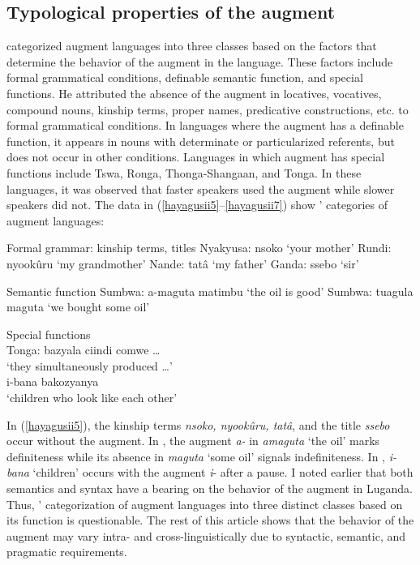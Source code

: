 \documentclass[output=paper]{langscibook}
\begin{document}
\subsection{Typological properties of the augment}
 categorized augment languages into three classes based on the factors that determine the behavior of the augment in the language. These factors include formal grammatical conditions, definable semantic function, and special functions. He attributed the absence of the augment in locatives, vocatives, compound nouns, kinship terms, proper names, predicative constructions, etc. to formal grammatical conditions. In languages where the augment has a definable function, it appears in nouns with determinate or particularized referents, but does not occur in other conditions. Languages in which augment has special functions include Tswa, Ronga, Thonga-Shangaan, and Tonga. In these languages, it was observed that faster speakers used the augment while slower speakers did not. The data in (\ref{hayagusii5}--\ref{hayagusii7}) show \citeauthor{blois1970augment}’ categories of augment languages:

\ea Formal grammar: kinship terms, titles
\label{hayagusii5}
  \ea\label{hayagusii5a} 	Nyakyusa: 	nsoko\hphantom{tiru} 		‘your mother’
  \ex\label{hayagusii5b} 	Rundi:\hphantom{iusa}		nyookûru 	‘my grandmother’
	\ex\label{hayagusii5c}  Nande:\hphantom{usa} 		tatâ\hphantom{okuru}		‘my father’
  \ex\label{hayagusii5d} 	Ganda:\hphantom{usa}		ssebo\hphantom{turu}		‘sir’
  \z
\z

\ea Semantic function
\label{hayagusii6}
  \ea\label{hayagusii6a} 	Sumbwa: 	a-maguta matimbu 	‘the oil is good’
  \ex\label{hayagusii6b} 	Sumbwa: 	tuagula maguta\hphantom{nbu} 	‘we bought some oil’
  \z
\z

\ea Special functions\\
\label{hayagusii7}
  \gllll Tonga:   {bazyala ciindi comwe \ldots}  \\
     {} {‘they simultaneously produced \ldots'} \\
     {} {i-bana bakozyanya} \\
     {} {`children who look like each other’}\\
\z

In (\ref{hayagusii5}), the kinship terms \textit{nsoko, nyookûru, tatâ}, and the title \textit{ssebo} occur without the augment. In , the augment \textit{a-} in \textit{amaguta} ‘the oil’ marks definiteness while its absence in \textit{maguta} ‘some oil’  signals indefiniteness. In , \textit{i-bana} ‘children’ occurs with the augment \textit{i}- after a pause. I noted earlier that both semantics and syntax have a bearing on the behavior of the augment in Luganda. Thus, \citeauthor{blois1970augment}’ categorization of augment languages into three distinct classes based on its function is questionable. The rest of this article shows that the behavior of the augment may vary intra- and cross-linguistically due to syntactic, semantic, and pragmatic requirements.
\end{document}
